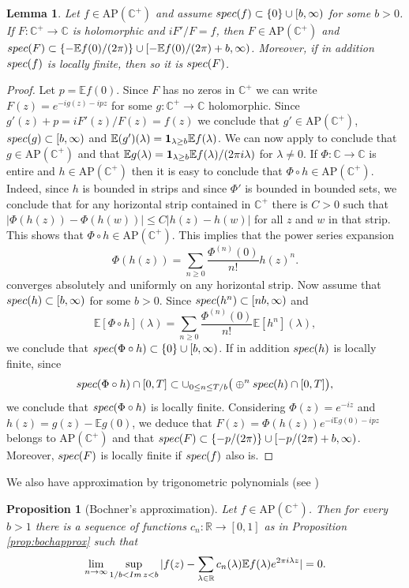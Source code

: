 \documentclass[a4paper,reqno,12pt]{amsart}
\newtheorem{lemma}[theorem]{Lemma}
\newtheorem{proposition}[theorem]{Proposition}\newtheorem{corollary}[theorem]{Corollary}
\newcommand{\E}{\mathcal{E}}
\renewcommand{\H}{\mathbb{C}^+}
\renewcommand{\r}{\mathbb{R}}
\newcommand{\cp}{\mathbb{C}} %
\newcommand{\la}{\lambda}
\newcommand{\1}{{\bf 1}}
\newcommand{\apc}{\mathrm{AP}(\H)}
\renewcommand{\E}{\mathbb{E}}
\renewcommand{\1}{{\bo 1}}
\renewcommand{\Im}{{\rm Im}\,}
\newcommand{\spec}{{\rm spec}}
\begin{document}
\begin{lemma}\label{lem:expprim}
Let $f\in \apc$ and assume $\spec(f)\subset \{0\}\cup [b,\infty)$ for some $b>0$. If $F:\H\to\cp$ is holomorphic and $iF'/F=f$, then $F\in \apc$ and  $\spec(F)\subset \{-\E f(0)/(2\pi)\} \cup  [-\E f(0)/(2\pi)+b,\infty)$. Moreover, if in addition $\spec(f)$ is locally finite, then so it is $\spec(F)$.
\end{lemma}
\begin{proof}
Let $p=\E f(0)$. Since $F$ has no zeros in $\H$ we can write $F(z)=e^{-ig(z)-ipz}$ for some $g:\H\to\cp$ holomorphic. Since $g'(z)+p=iF'(z)/F(z)=f(z)$ we conclude that $g'\in \apc$, $\spec(g)\subset [b,\infty)$ and $\E (g')(\la)=\1_{\la\geq b} \E f(\la)$.  We can now apply \cite[Thm. 9, p. 152]{Be} to conclude that $g\in \apc$ and that $\E g(\la)=\1_{\la\geq b} \E f(\la)/(2\pi i \la)$ for $\la \neq 0$. If $\Phi:\cp\to\cp$ is entire and $h\in \apc$ then it is easy to conclude that $\Phi\circ h\in  \apc$. Indeed, since $h$ is bounded in strips and since $\Phi'$ is bounded in bounded sets, we conclude that for any horizontal strip contained in $\H$ there is $C>0$ such that $|\Phi(h(z))-\Phi(h(w))| \leq C|h(z)-h(w)|$ for all $z$ and $w$ in that strip. This shows that $\Phi\circ h\in \apc$. This implies that the power series expansion
$$
\Phi(h(z)) = \sum_{n\geq 0} \frac{\Phi^{(n)}(0)}{n!}h(z)^n.
$$
converges absolutely and uniformly on any horizontal strip. Now assume that $\spec(h)\subset [b,\infty)$ for some $b>0$. Since $\spec(h^n)\subset [nb,\infty)$ and
$$
\E [\Phi \circ h](\la) = \sum_{n\geq 0} \frac{\Phi^{(n)}(0)}{n!}\E[h^n](\la),
$$
we conclude that $\spec(\Phi \circ h) \subset \{0\}\cup [b,\infty) $. If in addition $\spec(h)$ is locally finite, since $$\spec(\Phi \circ h) \cap [0,T] \subset \cup_{0\leq n \leq T/b}\big(\oplus^n\spec(h)\cap [0,T]\big),$$ we conclude that $\spec(\Phi \circ h)$ is locally finite.
Considering $\Phi(z)=e^{-iz}$ and $h(z)=g(z)-\E g(0)$, we deduce that $F(z)=\Phi(h(z))e^{-i\E g(0)-ipz}$ belongs to $\apc$ and that $\spec(F)\subset \{-p/(2\pi)\} \cup  [-p/(2\pi)+b,\infty)$. Moreover, $\spec(F)$ is locally finite if $\spec(f)$ also is.
\end{proof}

We also have approximation by trigonometric polynomials (see \cite[p. 148]{Be})
\begin{proposition}[Bochner's approximation]\label{prop:bochapprox2}
Let $f\in \apc$. Then for every $b>1$ there is a sequence of functions $c_n:\r\to[0,1]$ as in Proposition \ref{prop:bochapprox} such that
$$
\lim_{n\to\infty} \sup_{1/b < \Im z < b} |f(z) - \sum_{\la\in\r} c_n(\la)\E f(\la) e^{2\pi i \la z}|=0.
$$
\end{proposition}
\end{document}
